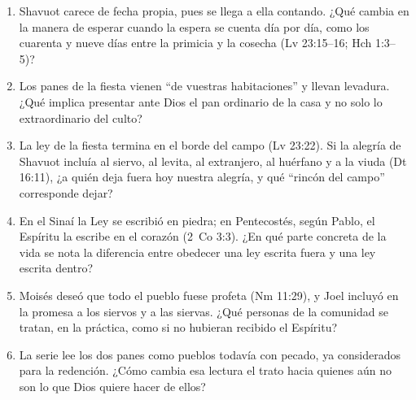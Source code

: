 \documentclass[11pt,letterpaper]{article}
\begin{document}
\begin{enumerate}
\item Shavuot carece de fecha propia, pues se llega a ella contando. ¿Qué cambia en la manera de esperar cuando la espera se cuenta día por día, como los cuarenta y nueve días entre la primicia y la cosecha (Lv 23:15--16; Hch 1:3--5)?
\item Los panes de la fiesta vienen ``de vuestras habitaciones'' y llevan levadura. ¿Qué implica presentar ante Dios el pan ordinario de la casa y no solo lo extraordinario del culto?
\item La ley de la fiesta termina en el borde del campo (Lv 23:22). Si la alegría de Shavuot incluía al siervo, al levita, al extranjero, al huérfano y a la viuda (Dt 16:11), ¿a quién deja fuera hoy nuestra alegría, y qué ``rincón del campo'' corresponde dejar?
\item En el Sinaí la Ley se escribió en piedra; en Pentecostés, según Pablo, el Espíritu la escribe en el corazón (2~Co 3:3). ¿En qué parte concreta de la vida se nota la diferencia entre obedecer una ley escrita fuera y una ley escrita dentro?
\item Moisés deseó que todo el pueblo fuese profeta (Nm 11:29), y Joel incluyó en la promesa a los siervos y a las siervas. ¿Qué personas de la comunidad se tratan, en la práctica, como si no hubieran recibido el Espíritu?
\item La serie lee los dos panes como pueblos todavía con pecado, ya considerados para la redención. ¿Cómo cambia esa lectura el trato hacia quienes aún no son lo que Dios quiere hacer de ellos?
\end{enumerate}

\end{document}
